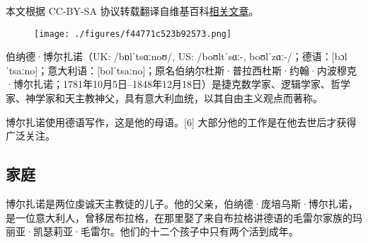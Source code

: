 
本文根据 CC-BY-SA 协议转载翻译自维基百科\href{https://en.wikipedia.org/wiki/Bernard_Bolzano}{相关文章}。

\begin{figure}[ht]
\centering
\texttt{[image: ./figures/f44771c523b92573.png]}
\caption{} \label{fig_Bolzan_1}
\end{figure}
伯纳德·博尔扎诺（UK: /bɒlˈtsɑːnoʊ/, US: /boʊltˈsɑː-, boʊlˈzɑː-/；德语：[bɔlˈtsaːno]；意大利语：[bolˈtsaːno]；原名伯纳尔杜斯·普拉西杜斯·约翰·内波穆克·博尔扎诺；1781年10月5日–1848年12月18日）是捷克数学家、逻辑学家、哲学家、神学家和天主教神父，具有意大利血统，以其自由主义观点而著称。

博尔扎诺使用德语写作，这是他的母语。[6] 大部分他的工作是在他去世后才获得广泛关注。
\subsection{家庭}  
博尔扎诺是两位虔诚天主教徒的儿子。他的父亲，伯纳德·庞培乌斯·博尔扎诺，是一位意大利人，曾移居布拉格，在那里娶了来自布拉格讲德语的毛雷尔家族的玛丽亚·凯瑟莉亚·毛雷尔。他们的十二个孩子中只有两个活到成年。

